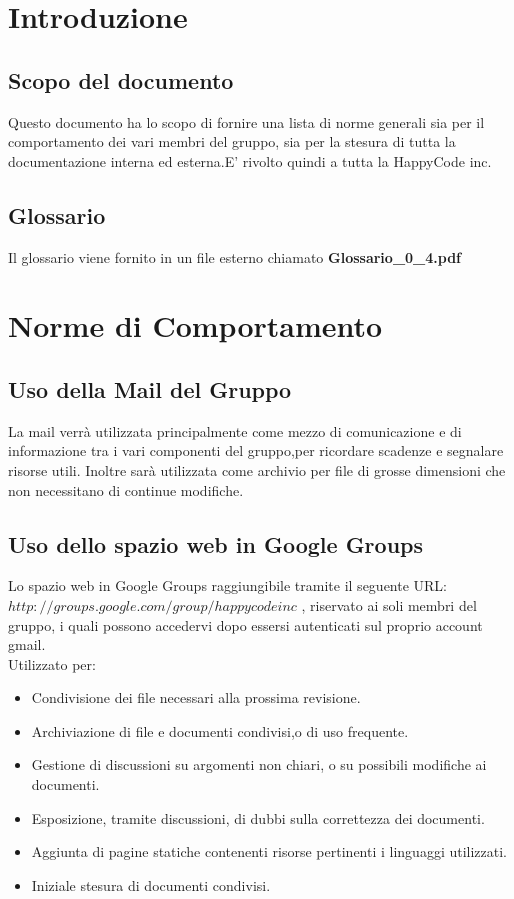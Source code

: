 \documentclass[11pt,titlepage,a4paper]{report}
\begin{document}
\begin{center}
\begin{table}[hbtp]
{}
\end{table}
\end{center}


\newpage
\tableofcontents 


\chapter{Introduzione}
\section{Scopo del documento}
Questo documento ha lo scopo di fornire una lista di norme
generali sia per il comportamento dei vari membri del gruppo,
sia per la stesura di tutta la documentazione interna
ed esterna.E' rivolto quindi a tutta la HappyCode inc.

\section{Glossario}
Il glossario viene fornito in un file esterno chiamato \textbf {Glossario\_0\_4.pdf} 

\chapter{Norme di Comportamento}
\section{Uso della Mail del Gruppo}
	La mail verr\`a utilizzata principalmente come mezzo di comunicazione 
	e di informazione tra i vari componenti del gruppo,per ricordare scadenze e  segnalare risorse utili.
	Inoltre sar\`a utilizzata come archivio per file di grosse dimensioni
	che non necessitano di continue modifiche.

\section{Uso dello spazio web in Google Groups}
	Lo spazio web in Google Groups raggiungibile tramite il seguente URL: \({http://groups.google.com/group/happycodeinc}\)
	, riservato ai soli membri del gruppo, i quali possono accedervi 
 dopo essersi autenticati sul proprio account gmail.\\
	Utilizzato per:
	\begin{itemize}
	\item Condivisione dei file necessari alla prossima revisione.
	\item Archiviazione di file e documenti condivisi,o di uso frequente.
	\item Gestione di discussioni su argomenti non chiari, o su possibili modifiche ai documenti.
	\item Esposizione, tramite discussioni, di dubbi sulla correttezza dei documenti.
	\item Aggiunta di pagine statiche contenenti risorse pertinenti i linguaggi utilizzati.
	\item Iniziale stesura di documenti condivisi. 
\end{itemize}
\end{document}
